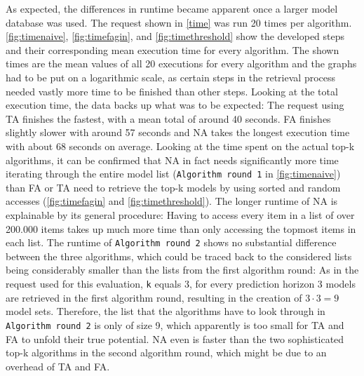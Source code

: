As expected, the differences in runtime became apparent once a larger model database was used. The request shown in \autoref{time} was run 20 times per algorithm.  \autoref{fig:timenaive}, \autoref{fig:timefagin}, and \autoref{fig:timethreshold} show the developed steps and their corresponding mean execution time for every algorithm. The shown times are the mean values of all 20 executions for every algorithm and the graphs had to be put on a logarithmic scale, as certain steps in the retrieval process needed vastly more time to be finished than other steps. Looking at the total execution time, the data backs up what was to be expected: The request using TA finishes the fastest, with a mean total of around 40 seconds. FA finishes slightly slower with around 57 seconds and NA takes the longest execution time with about 68 seconds on average. Looking at the time spent on the actual top-k algorithms, it can be confirmed that NA in fact needs significantly more time iterating through the entire model list (\texttt{Algorithm round 1} in \autoref{fig:timenaive}) than FA or TA need to retrieve the top-k models by using sorted and random accesses (\autoref{fig:timefagin} and \autoref{fig:timethreshold}). The longer runtime of NA is explainable by its general procedure: Having to access every item in a list of over 200.000 items takes up much more time than only accessing the topmost items in each list. The runtime of \texttt{Algorithm round 2} shows no substantial difference between the three algorithms, which could be traced back to the considered lists being considerably smaller than the lists from the first algorithm round: As in the request used for this evaluation, \texttt{k} equals $3$, for every prediction horizon 3 models are retrieved in the first algorithm round, resulting in the creation of $3 \cdot{} 3 = 9$ model sets. Therefore, the list that the algorithms have to look through in \texttt{Algorithm round 2} is only of size 9, which apparently is too small for TA and FA to unfold their true potential. NA even is faster than the two sophisticated top-k algorithms in the second algorithm round, which might be due to an overhead of TA and FA.


